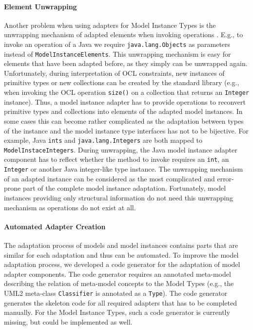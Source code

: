 	\paragraph{Element Unwrapping\add{:}}
	Another problem when using adapters for Model Instance Types 
	is the unwrapping mechanism of adapted elements when invoking operations 
	. E.g., to invoke an operation of a Java 
	 we require \texttt{java.lang.Objects} as parameters instead of 
	\texttt{ModelInstanceElements}. This unwrapping mechanism is easy 
	for elements that have been adapted before, as they simply can be unwrapped 
	again. Unfortunately, during interpretation of OCL constraints, 
	new instances of primitive types or new collections can be created 
	by the standard library (e.g., when invoking the OCL operation \texttt{size()} on a collection that 
	returns an \texttt{Integer} instance). Thus, a 
	model instance adapter has to provide operations to reconvert 
	primitive types and collections into elements of the adapted model 
	instances. In some cases this can become rather complicated as 
	the adaptation between types of the instance and the model 
	instance type interfaces has not to be bijective. For 
	example, Java \texttt{ints} and \texttt{java.lang.Integers} are 
	both mapped to \texttt{ModelInstaceIntegers}. During unwrapping, 
	the Java model instance adapter component has to reflect 
	whether the method to invoke requires an \texttt{int}, an 
	\texttt{Integer} or another Java integer-like type instance.
	The unwrapping mechanism of an adapted instance 
	can be considered as the most complicated and error-prone part 
	of the complete model instance adaptation.
	Fortunately, model instances providing only structural information  do not
	need this unwrapping mechanism as operations do not exist at all.

	\paragraph{Automated Adapter Creation\add{:}}
	The adaptation process of models and model 
	instances contains parts that are similar 
	for each adaptation and thus can be automated.
	To improve the model adaptation process, we developed a code generator 
	for the adaptation of model adapter components. The code 
	generator requires an annotated meta-model describing
	the relation of meta-model concepts to the Model Types (e.g., the UML2 meta-class
	\texttt{Classifier} is annotated as a \texttt{Type}). 
	The code generator generates the skeleton code for all required 
	adapters that has to be completed manually.
	For the Model Instance Types, such a code generator is currently 
	missing, but could be implemented as well.
	
